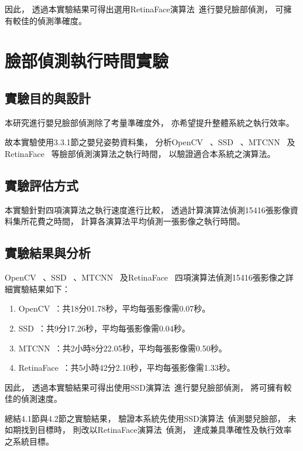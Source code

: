 \documentclass[class=NCU_thesis, crop=false]{standalone}
\begin{document}
因此，
透過本實驗結果可得出選用RetinaFace演算法~\cite{deng_retinaface_2020}進行嬰兒臉部偵測，
可擁有較佳的偵測準確度。

\section{臉部偵測執行時間實驗}
\subsection{實驗目的與設計}
本研究進行嬰兒臉部偵測除了考量準確度外，
亦希望提升整體系統之執行效率。

故本實驗使用3.3.1節之嬰兒姿勢資料集，
分析OpenCV~\cite{goyal_face_2017}
、SSD~\cite{ye_face_2021}
、MTCNN~\cite{zhang_joint_2016}
及RetinaFace~\cite{deng_retinaface_2020}
等臉部偵測演算法之執行時間，
以驗證適合本系統之演算法。

\subsection{實驗評估方式}
本實驗針對四項演算法之執行速度進行比較，
透過計算演算法偵測15416張影像資料集所花費之時間，
計算各演算法平均偵測一張影像之執行時間。

\subsection{實驗結果與分析}
OpenCV~\cite{goyal_face_2017}
、SSD~\cite{ye_face_2021}
、MTCNN~\cite{zhang_joint_2016}
及RetinaFace~\cite{deng_retinaface_2020}
四項演算法偵測15416張影像之詳細實驗結果如下：
\begin{enumerate}
    \item OpenCV~\cite{goyal_face_2017}：共18分01.78秒，平均每張影像需0.07秒。
    \item SSD~\cite{ye_face_2021}：共9分17.26秒，平均每張影像需0.04秒。
    \item MTCNN~\cite{zhang_joint_2016}：共2小時8分22.05秒，平均每張影像需0.50秒。
    \item RetinaFace~\cite{deng_retinaface_2020}：共5小時42分2.10秒，平均每張影像需1.33秒。
\end{enumerate}

因此，
透過本實驗結果可得出使用SSD演算法~\cite{ye_face_2021}進行嬰兒臉部偵測，
將可擁有較佳的偵測速度。

總結4.1節與4.2節之實驗結果，
驗證本系統先使用SSD演算法~\cite{ye_face_2021}偵測嬰兒臉部，
未如期找到目標時，
則改以RetinaFace演算法~\cite{deng_retinaface_2020}偵測，
達成兼具準確性及執行效率之系統目標。
\end{document}

